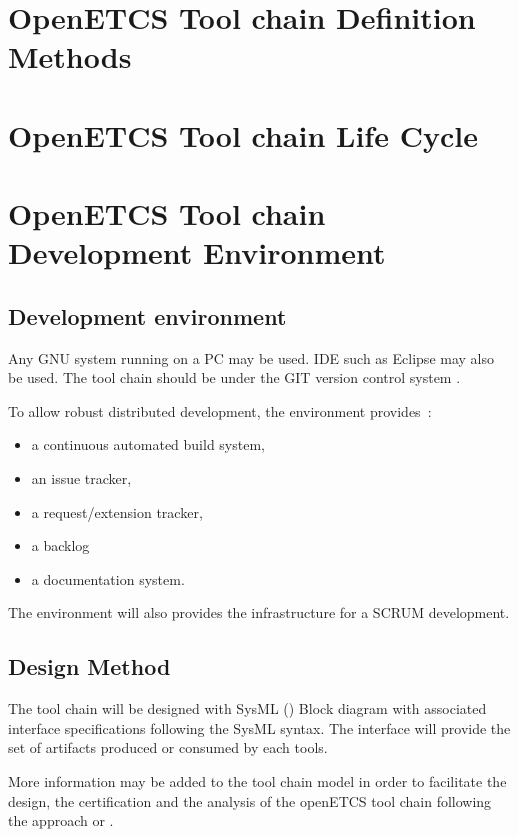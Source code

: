 \documentclass{openetcs_article}
\begin{document}
\section{OpenETCS Tool chain Definition Methods}
\label{sec:toolchaindef}



\section{OpenETCS Tool chain Life Cycle}
\label{sec:lifecycle}


\section{OpenETCS Tool chain Development Environment}
\label{sec:env}
\subsection{Development environment}
Any GNU system running on a PC may be used. \gls{IDE}  such as Eclipse may
also be used. 
The tool chain should be under the GIT  version control system
\cite{Chacon:2009}.


To allow robust distributed development, the  environment provides~:
\begin{itemize}
\item  a continuous automated build system,
\item an issue tracker,
\item a request/extension tracker,
\item a backlog
\item a  documentation system.
\end{itemize}
The environment will also provides the infrastructure for a SCRUM development.


\subsection{Design Method}
The tool chain will be designed with SysML (\cite{SysML}) Block
diagram with associated interface specifications following the SysML syntax.
The interface will provide the set of artifacts produced or consumed by each tools.

More information may be added to the tool chain model in
order to facilitate the design, the certification and the analysis  of
the openETCS tool chain following the approach
\cite{slotosch_model-based_2012} or \cite{asplund_towards_2012}.
\end{document}
